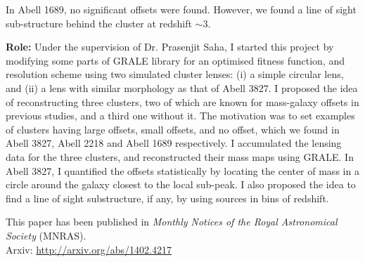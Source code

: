 In Abell 1689, no significant offsets were found. However,  
we found a line of sight sub-structure behind the cluster at
redshift $\sim 3$. 

{\bf Role:} Under the supervision of Dr. Prasenjit Saha,
I started this project by modifying some parts of 
GRALE library for an optimised fitness function, and resolution scheme
using two simulated cluster lenses: (i) a simple circular lens, and 
(ii) a lens with similar morphology as that of Abell 3827. I proposed the
idea of reconstructing three clusters, two of which are known for
mass-galaxy offsets in previous studies, 
and a third one without it. The motivation was to set examples 
of clusters having large offsets, small offsets, and no offset, which we
found in Abell 3827, Abell 2218 and Abell 1689 respectively. I accumulated
the lensing data for the three clusters, and reconstructed their mass 
maps using GRALE. In Abell 3827, I quantified the offsets statistically
by locating the center of mass in a circle around the galaxy closest to 
the local sub-peak. I also proposed the idea to find a line of sight
substructure, if any, by using sources in bins of redshift.


This paper has been published in {\it Monthly Notices of the Royal Astronomical
Society} (MNRAS). 
\\
Arxiv: \url{http://arxiv.org/abs/1402.4217}


\clearpage
